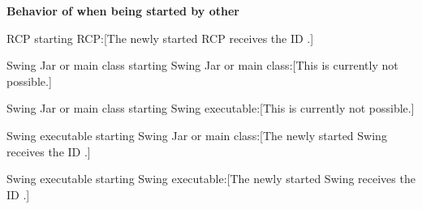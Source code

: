 \textbf{Behavior of \gdauts{} when being started by other \gdauts{}}\\
\begin{description}
\item {RCP starting RCP:}[The newly started RCP \gdaut{} receives the ID .]
\item {Swing Jar or main class starting Swing Jar or main class:}[This is currently not possible.]
\item {Swing Jar or main class starting Swing executable:}[This is currently not possible.]
\item {Swing executable starting Swing Jar or main class:}[The newly started Swing \gdaut{} receives the ID .]
\item {Swing executable starting Swing executable:}[The newly started Swing \gdaut{} receives the ID .]
\end{description}

